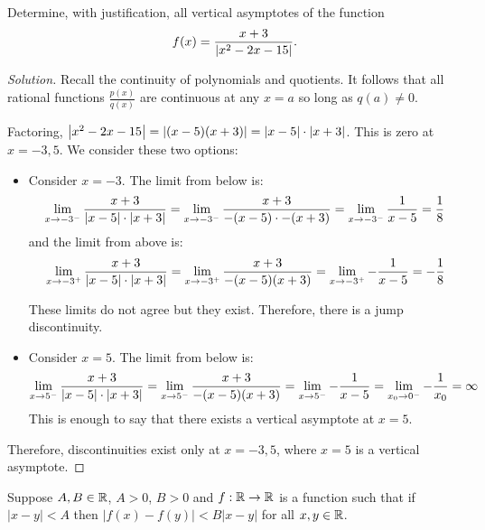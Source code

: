 \documentclass{agony}
\begin{document}
\question Determine, with justification, all vertical asymptotes of the function
\[ f(x) = \frac{x+3}{\abs{x^2-2x-15}}. \]
\begin{proof}[Solution]
  Recall the continuity of polynomials and quotients.
  It follows that all rational functions $\frac{p(x)}{q(x)}$ are continuous at any $x=a$ so long as $q(a)\neq 0$.

  Factoring, $\abs{x^2-2x-15}=\abs{(x-5)(x+3)}=\abs{x-5}\cdot\abs{x+3}$.
  This is zero at $x=-3,5$.
  We consider these two options:
  \begin{itemize}
    \item Consider $x=-3$. The limit from below is:
          \begin{equation*}
            \lim\limits_{x\to-3^-} \frac{x+3}{\abs{x-5}\cdot\abs{x+3}}
            = \lim\limits_{x\to-3^-} \frac{x+3}{-(x-5)\cdot-(x+3)}
            = \lim\limits_{x\to-3^-} \frac{1}{x-5}
            = \frac{1}{8}
          \end{equation*}
          and the limit from above is:
          \begin{equation*}
            \lim\limits_{x\to-3^+} \frac{x+3}{\abs{x-5}\cdot\abs{x+3}}
            = \lim\limits_{x\to-3^+} \frac{x+3}{-(x-5)(x+3)}
            = \lim\limits_{x\to-3^+} -\frac{1}{x-5}
            = -\frac{1}{8}
          \end{equation*}

          These limits do not agree but they exist.
          Therefore, there is a jump discontinuity.
    \item Consider $x=5$. The limit from below is:
          \begin{equation*}
            \lim\limits_{x\to5^-} \frac{x+3}{\abs{x-5}\cdot\abs{x+3}}
            = \lim\limits_{x\to5^-} \frac{x+3}{-(x-5)(x+3)}
            = \lim\limits_{x\to5^-} -\frac{1}{x-5}
            = \lim\limits_{x_0\to0^-} -\frac{1}{x_0}
            = \infty
          \end{equation*}
          This is enough to say that there exists a vertical asymptote at $x=5$.
  \end{itemize}

  Therefore, discontinuities exist only at $x=-3,5$, where $x=5$ is a vertical asymptote.
\end{proof}

\question Suppose $A,B \in \mathbb{R}$, $A>0$, $B>0$ and $f:\mathbb{R}\to\mathbb{R}$ is a function such that
if $|x-y| < A$ then $|f(x)-f(y)| < B|x-y|$ for all $x,y\in\mathbb{R}$.
\end{document}
